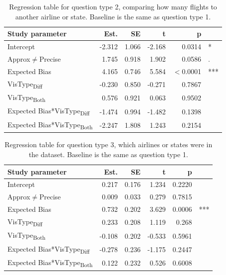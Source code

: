 \documentclass[10pt,journal,compsoc]{IEEEtran}
\begin{document}
\begin{table}[!t]
\renewcommand{\arraystretch}{1.3}
\caption{Regression table for question type 2, comparing how many flights to another airline or state. Baseline is the same as question type 1.}
\label{table_q2}
\centering
\begin{tabular}{|l||r|r|r|r@{}l|}
\hline
Study parameter & Est. & SE & t & p & \\
\hline
\hline
Intercept & -2.312 & 1.066 & -2.168 & 0.0314 & * \\
\hline
Approx$\neq$Precise & 1.745 & 0.918 & 1.902 & 0.0586 & . \\
\hline
Expected Bias & 4.165 & 0.746 & 5.584 & $<$0.0001 & *** \\
\hline
VisType\textsubscript{Diff} & -0.230 & 0.850 & -0.271 & 0.7867 &  \\
\hline
VisType\textsubscript{Both} & 0.576 & 0.921 & 0.063 & 0.9502 &  \\
\hline
Expected Bias*VisType\textsubscript{Diff} & -1.474 & 0.994 & -1.482 & 0.1398 &  \\
\hline
Expected Bias*VisType\textsubscript{Both} & -2.247 & 1.808 & 1.243 & 0.2154 &  \\
\hline
\end{tabular}
\end{table}

\begin{table}[!t]
\renewcommand{\arraystretch}{1.3}
\caption{Regression table for question type 3, which airlines or states were in the dataset. Baseline is the same as question type 1.}
\label{table_q3}
\centering
\begin{tabular}{|l||r|r|r|r@{}l|}
\hline
Study parameter & Est. & SE & t & p & \\
\hline
\hline
Intercept & 0.217 & 0.176 & 1.234 & 0.2220 &  \\
\hline
Approx$\neq$Precise & 0.009 & 0.033 & 0.279 & 0.7815 & \\
\hline
Expected Bias & 0.732 & 0.202 & 3.629 & 0.0006 & *** \\
\hline
VisType\textsubscript{Diff} & 0.233 & 0.208 & 1.119 & 0.268 &  \\
\hline
VisType\textsubscript{Both} & -0.108 & 0.202 & -0.533 & 0.5961 &  \\
\hline
Expected Bias*VisType\textsubscript{Diff} & -0.278 & 0.236 & -1.175 & 0.2447 & \\
\hline
Expected Bias*VisType\textsubscript{Both} & 0.122 & 0.232 & 0.526 & 0.6008 &  \\
\hline
\end{tabular}
\end{table}
\end{document}

